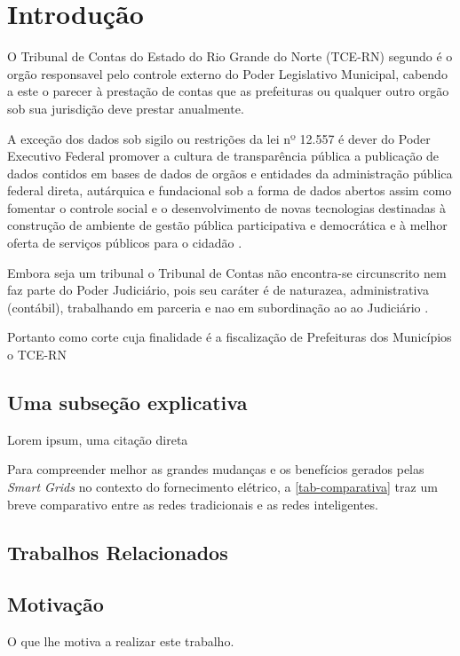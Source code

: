 \chapter[Introdução]{Introdução}
\label{ch:introducao}

  O Tribunal de Contas do Estado do Rio Grande do Norte (TCE-RN) segundo \cite{Legislativa} é o orgão responsavel pelo controle externo do Poder Legislativo Municipal, cabendo a este o parecer à prestação de contas que as prefeituras ou qualquer outro orgão sob sua jurisdição deve prestar anualmente.

  A exceção dos dados sob sigilo ou restrições da lei nº 12.557 \cite{lei_12527} é dever do Poder Executivo Federal promover a cultura de transparência pública a publicação de dados contidos em bases de dados de orgãos e entidades da administração pública federal direta, autárquica e fundacional sob a forma de dados abertos assim como fomentar o controle social e o desenvolvimento de novas tecnologias destinadas à construção de ambiente de gestão pública participativa e democrática e à melhor oferta de serviços públicos para o cidadão \cite{dec_8777}.

  Embora seja um tribunal o Tribunal de Contas não encontra-se circunscrito nem faz parte do Poder Judiciário, pois seu caráter é de naturazea, administrativa (contábil), trabalhando em parceria e nao em subordinação ao  ao Judiciário \cite{barreto_tribunais}.
  
  Portanto como corte cuja finalidade é a fiscalização de Prefeituras dos Municípios o TCE-RN 

\section{Uma subseção explicativa}

Lorem ipsum, uma citação direta 



Para compreender melhor as grandes mudanças e os benefícios gerados pelas \textit{Smart Grids} no contexto do fornecimento elétrico, a \autoref{tab-comparativa} traz um breve comparativo entre as redes tradicionais e as redes inteligentes.



\section{Trabalhos Relacionados}
\lipsum[1-1]

\section{Motivação}
O que lhe motiva a realizar este trabalho.

